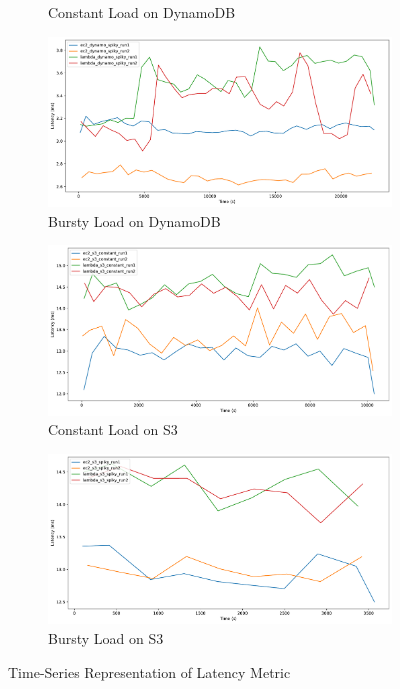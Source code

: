 \begin{figure}[h]
\begin{subfigure}{0.49\linewidth}
		\caption{Constant Load on DynamoDB}
		\label{fig:ts_ddb_const}
	\end{subfigure}
	\hfill
	\begin{subfigure}{0.49\linewidth}
		\centering
		\includegraphics[width=\linewidth]{./fig/ts-dynamo-bursty.pdf}
		\caption{Bursty Load on DynamoDB}
		\label{fig:ts_ddb_bursty}
	\end{subfigure}
	\vfill
	\begin{subfigure}{0.49\linewidth}
		\centering
		\includegraphics[width=\linewidth]{./fig/ts-s3-constant.pdf}
		\caption{Constant Load on S3}
		\label{fig:ts_s3_const}
	\end{subfigure}
	\hfill
	\begin{subfigure}{0.49\linewidth}
		\centering
		\includegraphics[width=\linewidth]{./fig/ts-s3-bursty.pdf}
		\caption{Bursty Load on S3}
		\label{fig:ts_s3_bursty}
	\end{subfigure}
	\caption{Time-Series Representation of Latency Metric}
	\label{fig:ts-plots}
\end{figure}

